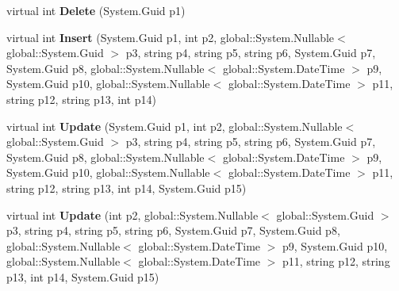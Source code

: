 \begin{DoxyCompactItemize}
\item 
virtual int {\bfseries Delete} (System.\+Guid p1)\hypertarget{class_products_1_1_data_1_1ds_sage_table_adapters_1_1ta_notiz_a4f74d89548f8857be01d81d677921d30}{}\label{class_products_1_1_data_1_1ds_sage_table_adapters_1_1ta_notiz_a4f74d89548f8857be01d81d677921d30}

\item 
virtual int {\bfseries Insert} (System.\+Guid p1, int p2, global\+::\+System.\+Nullable$<$ global\+::\+System.\+Guid $>$ p3, string p4, string p5, string p6, System.\+Guid p7, System.\+Guid p8, global\+::\+System.\+Nullable$<$ global\+::\+System.\+Date\+Time $>$ p9, System.\+Guid p10, global\+::\+System.\+Nullable$<$ global\+::\+System.\+Date\+Time $>$ p11, string p12, string p13, int p14)\hypertarget{class_products_1_1_data_1_1ds_sage_table_adapters_1_1ta_notiz_a5020c74b6fede41f1ff59b7c4f476244}{}\label{class_products_1_1_data_1_1ds_sage_table_adapters_1_1ta_notiz_a5020c74b6fede41f1ff59b7c4f476244}

\item 
virtual int {\bfseries Update} (System.\+Guid p1, int p2, global\+::\+System.\+Nullable$<$ global\+::\+System.\+Guid $>$ p3, string p4, string p5, string p6, System.\+Guid p7, System.\+Guid p8, global\+::\+System.\+Nullable$<$ global\+::\+System.\+Date\+Time $>$ p9, System.\+Guid p10, global\+::\+System.\+Nullable$<$ global\+::\+System.\+Date\+Time $>$ p11, string p12, string p13, int p14, System.\+Guid p15)\hypertarget{class_products_1_1_data_1_1ds_sage_table_adapters_1_1ta_notiz_a642e94b92b59cabfb93bdcaf063a0b71}{}\label{class_products_1_1_data_1_1ds_sage_table_adapters_1_1ta_notiz_a642e94b92b59cabfb93bdcaf063a0b71}

\item 
virtual int {\bfseries Update} (int p2, global\+::\+System.\+Nullable$<$ global\+::\+System.\+Guid $>$ p3, string p4, string p5, string p6, System.\+Guid p7, System.\+Guid p8, global\+::\+System.\+Nullable$<$ global\+::\+System.\+Date\+Time $>$ p9, System.\+Guid p10, global\+::\+System.\+Nullable$<$ global\+::\+System.\+Date\+Time $>$ p11, string p12, string p13, int p14, System.\+Guid p15)\hypertarget{class_products_1_1_data_1_1ds_sage_table_adapters_1_1ta_notiz_a951115bece2006e1bf5912882d47a567}{}\label{class_products_1_1_data_1_1ds_sage_table_adapters_1_1ta_notiz_a951115bece2006e1bf5912882d47a567}

\end{DoxyCompactItemize}
